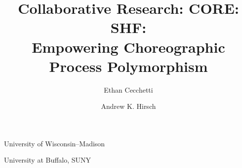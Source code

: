 

\title{Collaborative Research: CORE: SHF: \\ Empowering Choreographic Process Polymorphism}
\author{Ethan Cecchetti}{University of Wisconsin--Madison}
\author{Andrew K. Hirsch}{University at Buffalo, SUNY}

\ifdraft
  \usepackage{fancyhdr}
  \pagestyle{fancy}
  \fancyhf{}
  \def\headrulewidth{0pt}
  \fancyfoot[C]{\thepage}
\else
  \pagestyle{plain}
\fi



\newtheorem{goal}{Goal}


\newpage





